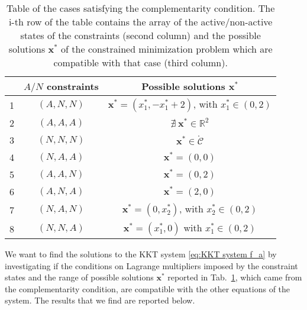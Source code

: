 \documentclass[a4paper,11pt]{article}
\begin{document}
\begin{table}[H]
	\centering
	\begin{tabular}{|c|c|c|}
		\hline
		& $A/N$ constraints & Possible solutions $\textbf{x}^*$ \\
		\hline
		1 & $(A, N, N)$ & $\textbf{x}^* = (x_{1}^*,-x_{1}^*+2)$, with $x_{1}^*\in (0,2)$\\
		2 & $(A, A, A)$ & $\nexists \ \textbf{x}^* \in \mathbb{R}^{2}$\\
		3 & $(N, N, N)$ & $\textbf{x}^* \in \mathring{\mathcal{C}}$\\
		4 & $(N, A, A)$ & $\textbf{x}^* = (0,0)$\\
		5 & $(A, A, N)$ & $\textbf{x}^* = (0,2)$\\
		6 & $(A, N, A)$ & $\textbf{x}^* = (2,0)$\\
		7 & $(N, A, N)$ & $\textbf{x}^* = (0,x_{2}^*)$, with $x_{2}^* \in (0,2)$\\
		8 & $(N, N, A)$ & $\textbf{x}^* = (x_{1}^*,0)$ with $x_{1}^* \in (0,2)$\\
		\hline
	\end{tabular}
	\caption{Table of the cases satisfying the complementarity condition. The i-th row of the table contains the array of the active/non-active states of the constraints (second column) and the possible solutions $\textbf{x}^*$ of the constrained minimization problem which are compatible with that case (third column).}
	\label{tab:complementarity conditions f_a}
\end{table}
\noindent We want to find the solutions to the KKT system \eqref{eq:KKT system f_a} by investigating if the conditions on Lagrange multipliers imposed by the constraint states and the range of possible solutions $\textbf{x}^*$ reported in Tab.~\ref*{tab:complementarity conditions f_a}, which came from the complementarity condition, are compatible with the other equations of the system.
The results that we find are reported below.
\end{document}
